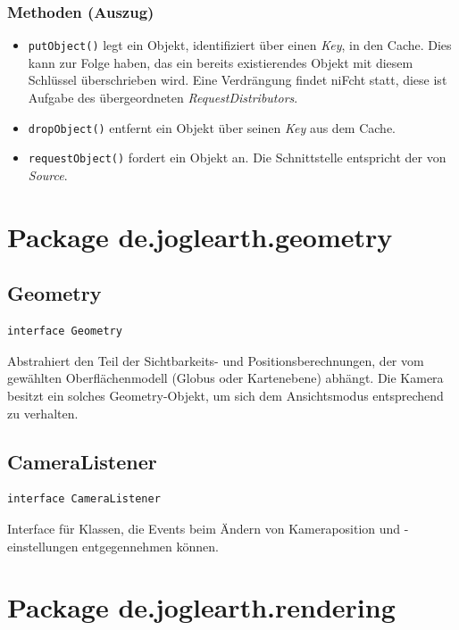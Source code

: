 \documentclass[10pt]{scrreprt}
\begin{document}
\subsubsection*{Methoden (Auszug)}
\begin{itemize}
\item \texttt{putObject()} legt ein Objekt, identifiziert über einen \textit{Key}, in den Cache. Dies kann zur Folge haben, das ein bereits existierendes Objekt mit diesem Schlüssel überschrieben wird. Eine Verdrängung findet niFcht statt, diese ist Aufgabe des übergeordneten \textit{RequestDistributors}.
\item \texttt{dropObject()} entfernt ein Objekt über seinen \textit{Key} aus dem Cache.
\item \texttt{requestObject()} fordert ein Objekt an. Die Schnittstelle entspricht der von \textit{Source}.
\end{itemize}
\vspace{5mm}


\section{Package de.joglearth.geometry}
\subsection*{Geometry}
\begin{lstlisting}
interface Geometry
\end{lstlisting}
Abstrahiert den Teil der Sichtbarkeits- und Positionsberechnungen, der vom gewählten Oberflächenmodell (Globus oder Kartenebene) abhängt. Die Kamera besitzt ein solches Geometry-Objekt, um sich dem Ansichtsmodus entsprechend zu verhalten.\\

\vspace{5mm}
\subsection*{CameraListener}
\begin{lstlisting}
interface CameraListener
\end{lstlisting}
Interface für Klassen, die Events beim Ändern von Kameraposition und -einstellungen entgegennehmen können.\\

\pagebreak
\vspace{5mm}
\section{Package de.joglearth.rendering}
\end{document}
